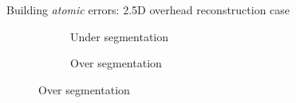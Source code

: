 \documentclass[10pt, export]{beamer}
\begin{document}
        \begin{frame}{Building \textit{atomic} errors: 2.5D overhead reconstruction case}
            \begin{figure}
                \begin{center}
                    \begin{subfigure}{.28\textwidth}
                        \caption{\label{fig::bul_under} Under segmentation}
                    \end{subfigure}
                    \hspace{10pt}
                    \begin{subfigure}{.28\textwidth}
                        \caption{\label{fig::bul_over} Over segmentation}

\end{subfigure}
\end{center}
\end{figure}
\end{frame}
\end{document}
